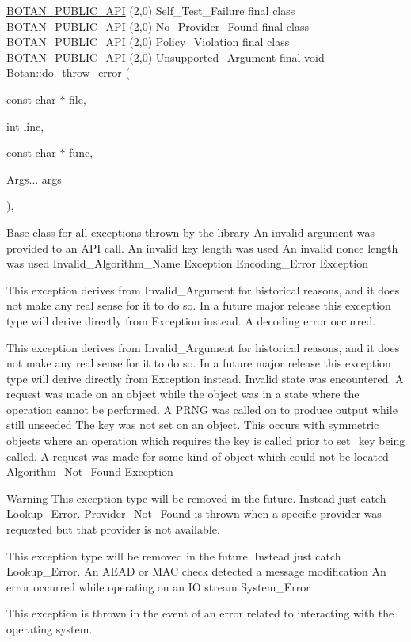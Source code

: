 {\hyperlink{namespace_botan_a6b9388030d872e586a4655b776ac9501}{B\+O\+T\+A\+N\+\_\+\+P\+U\+B\+L\+I\+C\+\_\+\+A\+PI} (2,0) Self\+\_\+\+Test\+\_\+\+Failure final class \hyperlink{namespace_botan_a6b9388030d872e586a4655b776ac9501}{B\+O\+T\+A\+N\+\_\+\+P\+U\+B\+L\+I\+C\+\_\+\+A\+PI} (2,0) No\+\_\+\+Provider\+\_\+\+Found final class \hyperlink{namespace_botan_a6b9388030d872e586a4655b776ac9501}{B\+O\+T\+A\+N\+\_\+\+P\+U\+B\+L\+I\+C\+\_\+\+A\+PI} (2,0) Policy\+\_\+\+Violation final class \hyperlink{namespace_botan_a6b9388030d872e586a4655b776ac9501}{B\+O\+T\+A\+N\+\_\+\+P\+U\+B\+L\+I\+C\+\_\+\+A\+PI} (2,0) Unsupported\+\_\+\+Argument final void Botan\+::do\+\_\+throw\+\_\+error (\begin{DoxyParamCaption}\item[{const char $\ast$}]{file,  }\item[{int}]{line,  }\item[{const char $\ast$}]{func,  }\item[{Args...}]{args }\end{DoxyParamCaption})\hspace{0.3cm}{\ttfamily [inline]}, {\ttfamily [final]}}

Base class for all exceptions thrown by the library An invalid argument was provided to an A\+PI call. An invalid key length was used An invalid nonce length was used Invalid\+\_\+\+Algorithm\+\_\+\+Name Exception Encoding\+\_\+\+Error Exception

This exception derives from Invalid\+\_\+\+Argument for historical reasons, and it does not make any real sense for it to do so. In a future major release this exception type will derive directly from Exception instead. A decoding error occurred.

This exception derives from Invalid\+\_\+\+Argument for historical reasons, and it does not make any real sense for it to do so. In a future major release this exception type will derive directly from Exception instead. Invalid state was encountered. A request was made on an object while the object was in a state where the operation cannot be performed. A P\+R\+NG was called on to produce output while still unseeded The key was not set on an object. This occurs with symmetric objects where an operation which requires the key is called prior to set\+\_\+key being called. A request was made for some kind of object which could not be located Algorithm\+\_\+\+Not\+\_\+\+Found Exception

\begin{DoxyWarning}{Warning}
This exception type will be removed in the future. Instead just catch Lookup\+\_\+\+Error. Provider\+\_\+\+Not\+\_\+\+Found is thrown when a specific provider was requested but that provider is not available.

This exception type will be removed in the future. Instead just catch Lookup\+\_\+\+Error. An A\+E\+AD or M\+AC check detected a message modification An error occurred while operating on an IO stream System\+\_\+\+Error
\end{DoxyWarning}
This exception is thrown in the event of an error related to interacting with the operating system.

